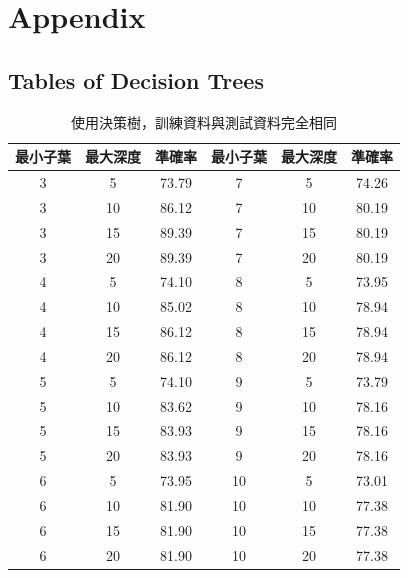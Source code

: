 \documentclass[11pt,a4paper]{extarticle}
\begin{document}
    \newpage
    \section*{Appendix}

    \subsection*{Tables of Decision Trees}

    \begin{table}[H]
        \centering
        \caption{使用決策樹，訓練資料與測試資料完全相同}\label{tab1}
        \vspace{1em}
        \begin{tabular}{ccc|ccc}
            \toprule
                最小子葉 &  最大深度 & 準確率 &  最小子葉 &  最大深度 & 準確率\\
            \midrule
            \hline
                3  &  5  &  73.79 \text{\%}  &  7  &  5  &  74.26 \text{\%}  \\
                3  & 10  &  86.12 \text{\%}  &  7  & 10  &  80.19 \text{\%}  \\
                3  & 15  &  89.39 \text{\%}  &  7  & 15  &  80.19 \text{\%}  \\
                3  & 20  &  89.39 \text{\%}  &  7  & 20  &  80.19 \text{\%}  \\
                4  &  5  &  74.10 \text{\%}  &  8  &  5  &  73.95 \text{\%}  \\
                4  & 10  &  85.02 \text{\%}  &  8  & 10  &  78.94 \text{\%}  \\
                4  & 15  &  86.12 \text{\%}  &  8  & 15  &  78.94 \text{\%}  \\
                4  & 20  &  86.12 \text{\%}  &  8  & 20  &  78.94 \text{\%}  \\
                5  &  5  &  74.10 \text{\%}  &  9  &  5  &  73.79 \text{\%}  \\
                5  & 10  &  83.62 \text{\%}  &  9  & 10  &  78.16 \text{\%}  \\
                5  & 15  &  83.93 \text{\%}  &  9  & 15  &  78.16 \text{\%}  \\
                5  & 20  &  83.93 \text{\%}  &  9  & 20  &  78.16 \text{\%}  \\
                6  &  5  &  73.95 \text{\%}  & 10  &  5  &  73.01 \text{\%}  \\
                6  & 10  &  81.90 \text{\%}  & 10  & 10  &  77.38 \text{\%}  \\
                6  & 15  &  81.90 \text{\%}  & 10  & 15  &  77.38 \text{\%}  \\
                6  & 20  &  81.90 \text{\%}  & 10  & 20  &  77.38 \text{\%}  \\
            \bottomrule
            \end{tabular}
    \end{table}
\end{document}
